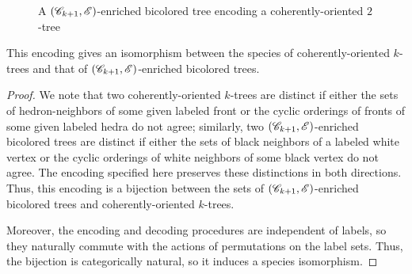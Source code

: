 \documentclass[sectionflow,singlespace,twoside]{brandiss} %
\numberwithin{section}{chapter}
\numberwithin{figure}{chapter}
\begin{document}
\begin{figure}[htb]
  \centering
  \caption{A $\left( {\mathscr{C}_{k+1}, \mathscr{E}} \right)$-enriched bicolored tree encoding a coherently-oriented $2$-tree}
  \label{fig:exbctree}
\end{figure}

\begin{theorem}\label{thm:bctreeenc}
  This encoding gives an isomorphism between the species of coherently-oriented $k$-trees and that of $\left( {\mathscr{C}_{k+1}, \mathscr{E}} \right)$-enriched bicolored trees.
\end{theorem}

\begin{proof}
  We note that two coherently-oriented $k$-trees are distinct if either the sets of hedron-neighbors of some given labeled front or the cyclic orderings of fronts of some given labeled hedra do not agree; similarly, two $\left( {\mathscr{C}_{k+1}, \mathscr{E}} \right)$-enriched bicolored trees are distinct if either the sets of black neighbors of a labeled white vertex or the cyclic orderings of white neighbors of some black vertex do not agree.
  The encoding specified here preserves these distinctions in both directions.
  Thus, this encoding is a bijection between the sets of $\left( {\mathscr{C}_{k+1}, \mathscr{E}} \right)$-enriched bicolored trees and coherently-oriented $k$-trees.

  Moreover, the encoding and decoding procedures are independent of labels, so they naturally commute with the actions of permutations on the label sets.
  Thus, the bijection is categorically natural, so it induces a species isomorphism.
\end{proof}
\end{document}
